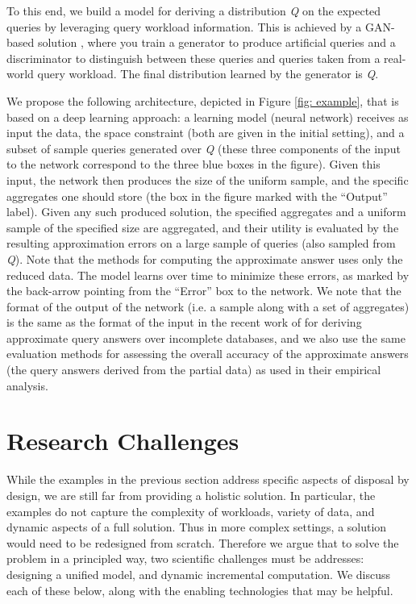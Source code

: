 \documentclass[11pt,dvipdfm]{article}
\begin{document}
To this end,  we build a model for deriving a distribution \textit{Q} on the expected queries by leveraging query workload information. This is achieved by a GAN-based solution \cite{creswell2018generative}, where you train a generator to produce artificial queries and a discriminator to distinguish between these queries and queries taken from a real-world query workload. The final distribution learned by the generator is \textit{Q}.  

We propose the following architecture, depicted in Figure \ref{fig: example}, that is based on a deep learning approach: a learning model (neural network) receives as input  the data, the space constraint (both are given in the initial setting), and a subset of sample queries generated over \textit{Q}  (these three components of the input to the network correspond to the three blue boxes in the figure). Given this input, the network then produces the size of the uniform sample, and the specific aggregates one should store (the box in the figure marked with the ``Output'' label). Given any such produced solution, the specified aggregates and a uniform sample of the specified size are aggregated, and their utility is evaluated by the resulting approximation errors on a large sample of queries (also sampled from \textit{Q}). 
Note that the methods for computing the approximate answer uses only the reduced data. 
The model learns over time to minimize these errors, as marked by the back-arrow pointing from the ``Error'' box to the network. We note that the format of the output of the network (i.e. a sample along with a set of aggregates) is the same as the format of the input in the recent work of \cite{Themis} for deriving approximate query answers over incomplete databases, and we also use the same evaluation methods for assessing the overall accuracy of the approximate answers (the query answers derived from the partial data) as used in their empirical analysis.


\section{Research Challenges}
\label{sec: challenges}
While the examples in the previous section address specific aspects of disposal by design, we are still far from providing a holistic solution. 
In particular, the examples do not capture the complexity of workloads, variety of data, and dynamic aspects of a full solution.  Thus in more complex settings, a solution would need to be redesigned from scratch.  Therefore we argue that to solve the problem in a principled way, two scientific challenges must be addresses:  designing a unified model, and dynamic incremental computation.
We discuss each of these below, along with the enabling technologies that may be helpful.
\end{document}
